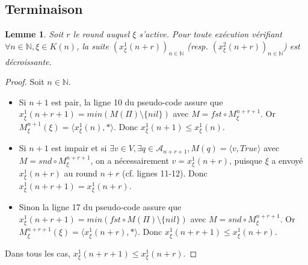 \documentclass{article}
\newtheorem{lemma}{Lemme}
\begin{document}
\subsection{Terminaison}

	\begin{lemma}
		Soit $r$ le round auquel $\xi$ s'active.
		Pour toute exécution vérifiant $\forall n \in \mathds{N}, \xi \in K(n)$,
		la suite $(x^1_\xi(n+r))_{n \in \mathds{N}}$ (resp. $(x^2_\xi(n+r))_{n \in \mathds{N}}$) est décroissante.
	\end{lemma}
	\begin{proof}
		Soit $n \in \mathds{N}$.
		\begin{itemize}

			\item Si $n+1$ est pair, la ligne 10 du pseudo-code assure que $x^1_\xi(n+r+1) = min(M(\Pi) \setminus \{nil\})$ avec $M = fst \circ M_\xi^{n+r+1}$.
				Or $M_\xi^{n+1}(\xi) = \langle x^1_\xi(n), * \rangle$.
				Donc $x^1_\xi(n+1) \leq x^1_\xi(n)$.
			\item Si $n+1$ est impair et si $\exists v \in V, \exists q \in \mathcal{A}_{n+r+1}, M(q) = \langle v, True \rangle$ avec $M = snd \circ M_\xi^{n+r+1}$,
				on a nécessairement $v = x^1_\xi(n+r)$, puisque $\xi$ a envoyé $x^1_\xi(n+r)$ au round $n+r$ (cf. lignes 11-12).
				Donc $x^1_\xi(n+r+1) = x^1_\xi(n+r)$.
			\item Sinon la ligne 17 du pseudo-code assure que $x^1_\xi(n+r+1) = min(fst \circ M(\Pi) \setminus \{nil\})$ avec $M = snd \circ M_\xi^{n+r+1}$.
				Or $M_\xi^{n+r+1}(\xi) = \langle x^1_\xi(n+r), * \rangle$.
				Donc $x^1_\xi(n+r+1) \leq x^1_\xi(n+r)$.

		\end{itemize}
		Dans tous les cas, $x^1_\xi(n+r+1) \leq x^1_\xi(n+r)$.
	\end{proof}
		
\end{document}
